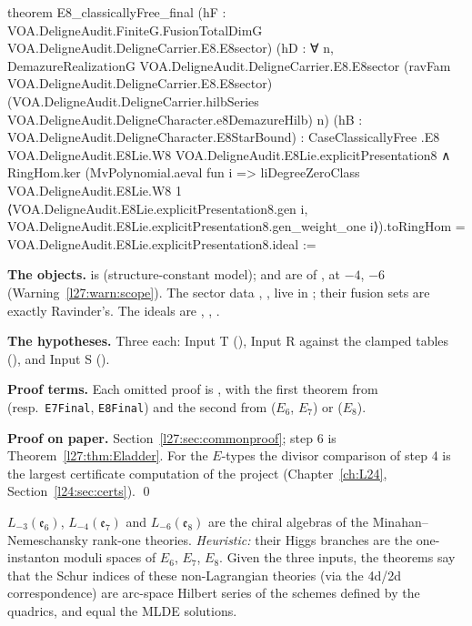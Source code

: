 \begin{leancode}
theorem E8_classicallyFree_final
    (hF : VOA.DeligneAudit.FiniteG.FusionTotalDimG VOA.DeligneAudit.DeligneCarrier.E8.E8sector)
    (hD : ∀ n, DemazureRealizationG VOA.DeligneAudit.DeligneCarrier.E8.E8sector
      (ravFam VOA.DeligneAudit.DeligneCarrier.E8.E8sector)
      (VOA.DeligneAudit.DeligneCarrier.hilbSeries VOA.DeligneAudit.DeligneCharacter.e8DemazureHilb) n)
    (hB : VOA.DeligneAudit.DeligneCharacter.E8StarBound) :
    CaseClassicallyFree .E8 VOA.DeligneAudit.E8Lie.W8 VOA.DeligneAudit.E8Lie.explicitPresentation8 ∧
      RingHom.ker (MvPolynomial.aeval fun i =>
        liDegreeZeroClass VOA.DeligneAudit.E8Lie.W8 1
          ⟨VOA.DeligneAudit.E8Lie.explicitPresentation8.gen i,
            VOA.DeligneAudit.E8Lie.explicitPresentation8.gen_weight_one i⟩).toRingHom =
        VOA.DeligneAudit.E8Lie.explicitPresentation8.ideal :=
\end{leancode}

\begin{dictionary}
\textbf{The objects.}  is  (structure-constant model);  and
 are  of ,  at $-4$, $-6$ (Warning~\ref{l27:warn:scope}). The sector data
, ,  live in ; their fusion sets are exactly Ravinder's. The ideals are
, , .

\textbf{The hypotheses.} Three each: Input T (), Input R against the clamped tables (), and Input S ().

\textbf{Proof terms.} Each omitted proof is
, with the first
theorem from  (resp.\ \texttt{E7Final}, \texttt{E8Final}) and the second from
 ($E_6$, $E_7$) or 
($E_8$).
\end{dictionary}

\textbf{Proof on paper.} Section~\ref{l27:sec:commonproof}; step 6 is Theorem~\ref{l27:thm:Eladder}. For the $E$-types the divisor
comparison of step 4 is the largest certificate computation of the project (Chapter~\ref{ch:L24}, Section~\ref{l24:sec:certs}). \qed

\begin{physics}
$L_{-3}(\mathfrak e_6)$, $L_{-4}(\mathfrak e_7)$ and $L_{-6}(\mathfrak e_8)$ are the chiral algebras of the Minahan--Nemeschansky rank-one
theories. \emph{Heuristic:} their Higgs branches are the one-instanton moduli spaces of $E_6$, $E_7$, $E_8$. Given the three inputs, the
theorems say that the Schur indices of these non-Lagrangian theories (via the 4d/2d correspondence) are arc-space Hilbert series of the
schemes defined by the quadrics, and equal the MLDE solutions.
\end{physics}

